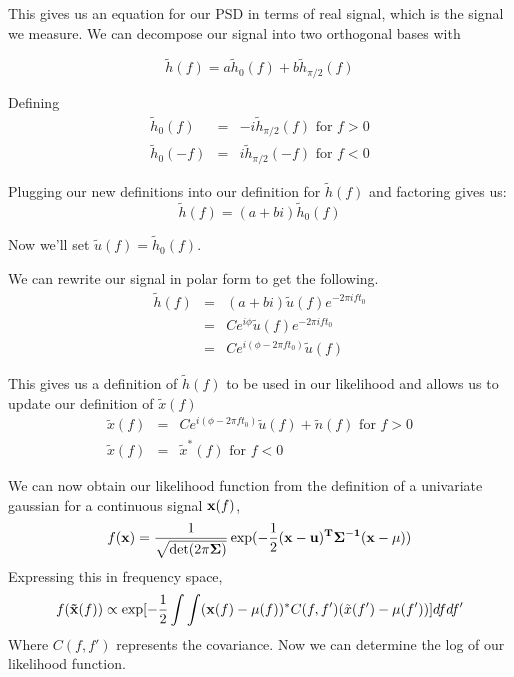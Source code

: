 \documentclass{iopart}
\begin{document}
This gives us an equation for our PSD in terms of real signal, which is the signal we measure. We can decompose our signal into two orthogonal bases with

\begin{equation}
	\tilde{h}(f) = a\tilde{h}_0(f) + b\tilde{h}_{\pi/2}(f)
\end{equation}

Defining
\begin{eqnarray}
	\tilde{h}_0(f) & = & -i \tilde{h}_{\pi/2}(f) \mbox{ for } f > 0 \\
	\tilde{h}_0(-f) & = & i \tilde{h}_{\pi/2}(-f) \mbox{ for } f < 0
\end{eqnarray}

Plugging our new definitions into our definition for $\tilde{h}(f)$ and factoring gives us:
\begin{equation}
	\tilde{h}(f) = (a + bi)\tilde{h}_0(f)
\end{equation}

Now we'll set $\tilde{u}(f) = \tilde{h}_0(f)$. 

We can rewrite our signal in polar form to get the following.
\begin{eqnarray}
	\tilde{h}(f) & = & (a + bi) \tilde{u}(f) e^{-2\pi ift_0} \\
	& = & Ce^{i \phi}\tilde{u}(f)e^{-2\pi ift_0} \\
	& = & Ce^{i(\phi - 2\pi ft_0)}\tilde{u}(f)
\end{eqnarray}

This gives us a definition of $\tilde{h}(f)$ to be used in our likelihood and allows us to update our definition of $\tilde{x}(f)$
\begin{eqnarray}
	\tilde{x}(f) & = & Ce^{i(\phi - 2\pi ft_0)}\tilde{u}(f) + \tilde{n}(f) \mbox{ for } f > 0 \\
	\tilde{x}(f) & = & \tilde{x}^*(f) \mbox{ for } f < 0
\end{eqnarray}

We can now obtain our likelihood function from the definition of a univariate gaussian for a continuous signal ${\bf{x}}(f)$,
\begin{equation}
	f({\bf{x}}) = \frac{1}{\sqrt{\det(2\pi \bf{\Sigma})}}\exp(-\frac{1}{2}(\bf{x}-\bf{u})^T\Sigma^{-1}(\bf{x}-\bf{\mu}))
\end{equation}
Expressing this in frequency space,
\begin{equation}
	f({\bf{\tilde{x}}}(f)) \propto \exp[-\frac{1}{2}\int\int( {\bf{x}}(f)-{\bf{\mu}}(f))^*C(f,f')(\tilde{x}(f')-\mu(f'))]dfdf'
\end{equation}
Where $C(f,f')$ represents the covariance. Now we can determine the log of our likelihood function.
\end{document}
